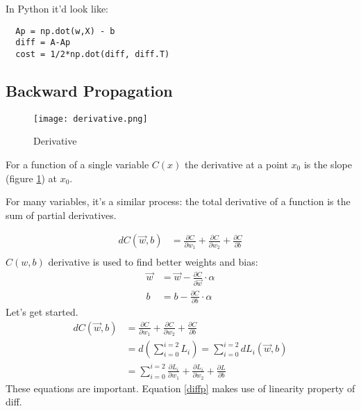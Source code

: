 In Python it'd look like:
\begin{center}
  \begin{BVerbatim}
  Ap = np.dot(w,X) - b
  diff = A-Ap 
  cost = 1/2*np.dot(diff, diff.T)
  \end{BVerbatim}
\end{center}





\subsection{Backward Propagation}
\begin{figure}
  \centering
  \texttt{[image: derivative.png]}
  \caption{Derivative}\label{fig:basics}
\end{figure}

For a function of a single variable $C(x)$ the derivative at a point $x_0$ is the slope (figure \ref{fig:basics}) at $x_0$.

For many variables, it's a similar process: the total derivative of a function is the sum of partial derivatives.

\begin{align}
  dC(\vec{w},b) &= \frac{\partial C}{\partial w_1}+ \frac{\partial C}{\partial w_2} + \frac{\partial C}{\partial b}\\
\end{align}
$C(w,b)$ derivative is used to find better weights and bias:
\begin{align}
  \vec{w} &= \vec{w} -\frac{\partial C}{\partial \vec{w}}\cdot{}\alpha\\
  b &= b -\frac{\partial C}{\partial b}\cdot{}\alpha
\end{align}
Let's get started.
\begin{align}
  dC(\vec{w},b) &= \frac{\partial C}{\partial w_1}+ \frac{\partial C}{\partial w_2} + \frac{\partial C}{\partial b}\\
  &= d(\sum_{i=0}^{i=2}L_i) = \sum_{i=0}^{i=2}dL_i(\vec{w},b) \label{diffp}\\
  &=\sum_{i=0}^{i=2} \frac{\partial L_i}{\partial w_1} +\frac{\partial L_i}{\partial w_2} + \frac{\partial L}{\partial b}
\end{align} 
These equations are important. Equation \ref{diffp} makes use of linearity property of diff.

